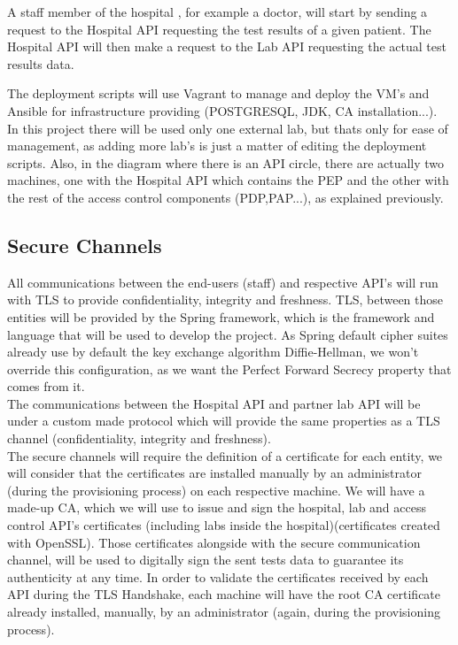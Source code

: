 A staff member of the hospital , for example a doctor, will start by sending a request to the Hospital API requesting the test results of a given patient. The Hospital API will then make a request to the Lab API requesting the actual test results data.

The deployment scripts will use Vagrant\cite{vagrant} to manage and deploy the VM's and Ansible\cite{Ansible} for infrastructure providing (POSTGRESQL, JDK, CA installation...). \\

In this project there will be used only one external lab, but thats only for ease of management, as adding more lab's is just a matter of editing the deployment scripts. Also, in the diagram where there is an API circle, there are actually two machines, one with the Hospital API which contains the PEP and the other with the rest of the access control components (PDP,PAP...), as explained previously.


\subsection{Secure Channels}

All communications between the end-users (staff) and respective API's will run with TLS to provide confidentiality, integrity and freshness. TLS, between those entities will be provided by the Spring framework\cite{springmvc}, which is the framework and language that will be used to develop the project. As Spring default cipher suites already use by default the key exchange algorithm Diffie-Hellman, we won't override this configuration, as we want the Perfect Forward Secrecy property that comes from it.  \\

The communications between the Hospital API and partner lab API will be under a custom made protocol which will provide the same properties as a TLS channel (confidentiality, integrity and freshness). \\
	
The secure channels will require the definition of a certificate for each entity, we will consider that the certificates are installed manually by an administrator (during the provisioning process) on each respective machine.
We will have a made-up CA, which we will use to issue and sign the hospital, lab and access control API's certificates (including labs inside the hospital)(certificates created with OpenSSL\cite{openssl}). Those certificates alongside with the secure communication channel, will be used to digitally sign the sent tests data to guarantee its authenticity at any time.
In order to validate the certificates received by each API during the TLS Handshake, each machine will have the root CA certificate already installed, manually, by an administrator (again, during the provisioning process).\\ 
 
